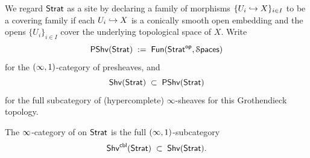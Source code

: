 We regard $\strat$ as a site by declaring a family of morphisms $\{U_i\hookra X\}_{i\in I}$ to be a covering family if each $U_i\hookra X$ is a conically smooth open embedding and the opens $\{U_i\}_{i\in I}$ cover the underlying topological space of $X$.
Write
\[
  \psh(\strat)\;:=\;\Fun(\strat^{\op},\Spaces)
\]
for the $(\oo,1)$-category of presheaves, and
\[
  \shv(\strat)\;\subset\;\psh(\strat)
\]
for the full subcategory of (hypercomplete) $\infty$-sheaves for this Grothendieck topology.


\begin{definition}
    The $\oo$-category of  on $\strat$ is the full $(\oo,1)$-subcategory 
    \begin{equation}
        \shv^{\cbl}(\strat) \; \subset \; \shv(\strat).
    \end{equation}
\end{definition}

